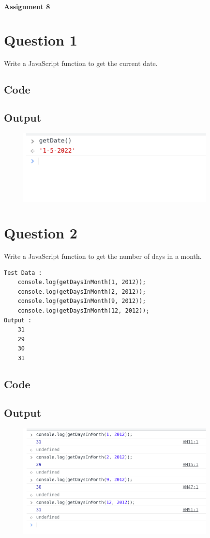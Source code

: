 \documentclass{article}
\begin{document}
{\centerline{\bfseries \Huge Assignment 8}}

\section*{Question 1}
Write a JavaScript function to get the current date.
\subsection*{Code}

\subsection*{Output}
\begin{figure}[H]
    \centering
    \includegraphics[width=10cm]{1/out.png}
\end{figure}

\newpage
\section*{Question 2}
Write a JavaScript function to get the number of days in a month.
\begin{lstlisting}
Test Data :
    console.log(getDaysInMonth(1, 2012));
    console.log(getDaysInMonth(2, 2012));
    console.log(getDaysInMonth(9, 2012));
    console.log(getDaysInMonth(12, 2012));
Output :
    31
    29
    30
    31
\end{lstlisting}
\subsection*{Code}

\subsection*{Output}
\begin{figure}[H]
    \centering
    \includegraphics[width=10cm]{2/out.png}
\end{figure}
\end{document}

